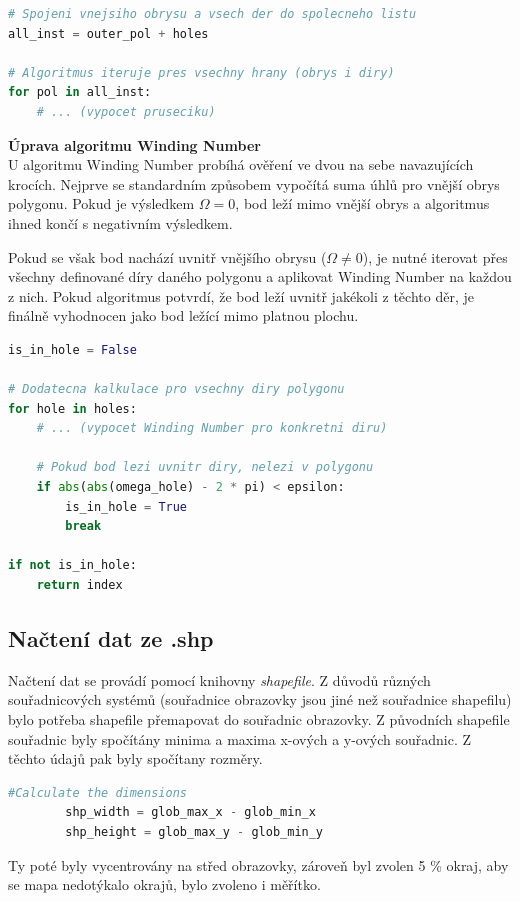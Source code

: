 \begin{lstlisting}[language=Python, caption=Zpracování děr v algoritmu Ray Crossing]
# Spojeni vnejsiho obrysu a vsech der do spolecneho listu
all_inst = outer_pol + holes

# Algoritmus iteruje pres vsechny hrany (obrys i diry)
for pol in all_inst:
    # ... (vypocet pruseciku)
\end{lstlisting}

\newpage
\vspace{0.5cm}
\textbf{Úprava algoritmu Winding Number}
\vspace{0.2cm}
\\
U algoritmu Winding Number probíhá ověření ve dvou na sebe navazujících krocích. Nejprve se standardním způsobem vypočítá suma úhlů pro vnější obrys polygonu. Pokud je výsledkem $\Omega = 0$, bod leží mimo vnější obrys a algoritmus ihned končí s negativním výsledkem.

Pokud se však bod nachází uvnitř vnějšího obrysu ($\Omega \neq 0$), je nutné iterovat přes všechny definované díry daného polygonu a aplikovat Winding Number na každou z nich. Pokud algoritmus potvrdí, že bod leží uvnitř jakékoli z těchto děr, je finálně vyhodnocen jako bod ležící mimo platnou plochu.

\begin{lstlisting}[language=Python, caption=Ověření polohy uvnitř díry pro Winding Number]
is_in_hole = False

# Dodatecna kalkulace pro vsechny diry polygonu
for hole in holes:
    # ... (vypocet Winding Number pro konkretni diru)
    
    # Pokud bod lezi uvnitr diry, nelezi v polygonu
    if abs(abs(omega_hole) - 2 * pi) < epsilon:
        is_in_hole = True
        break
        
if not is_in_hole:
    return index
\end{lstlisting}
\newpage
\subsection{Načtení dat ze .shp}
Načtení dat se provádí pomocí knihovny \textit{shapefile}. 
Z důvodů různých souřadnicových systémů (souřadnice obrazovky jsou jiné než souřadnice shapefilu) bylo potřeba shapefile přemapovat do souřadnic obrazovky. 
Z původních shapefile souřadnic byly spočítány minima a maxima x-ových a y-ových souřadnic.
Z těchto údajů pak byly spočítany rozměry. 
\begin{lstlisting}[language=Python, caption = Rozměry shapefile států Evropy.]
   #Calculate the dimensions
        shp_width = glob_max_x - glob_min_x
        shp_height = glob_max_y - glob_min_y 
\end{lstlisting}
Ty poté byly vycentrovány na střed obrazovky, zároveň byl zvolen 5 \% okraj, aby se mapa nedotýkalo okrajů, bylo zvoleno i měřítko. 

